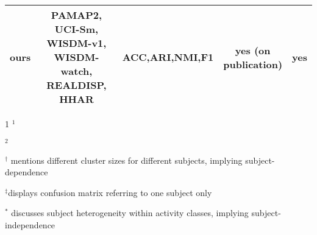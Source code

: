 \documentclass[wcp]{jmlr}
\begin{document}
\begin{table*}[h]
\begin{threeparttable}
{\begin{tabular}{|c|c|c|c|c|}
         \hline
         ours      &  \makecell{PAMAP2, UCI-Sm, \\ WISDM-v1, WISDM-watch, \\ REALDISP, HHAR} &   ACC,ARI,NMI,F1        &   \makecell{yes (on \\ publication)} & yes\\
         \hline
    \end{tabular}}
    \end{threeparttable}
    \begin{tablenotes}
        \footnotesize
        \item[1]{$^1$\cite{altun2010comparative}}
        \item$^2${\cite{malekzadeh2018protecting}}
        \item$^\dag$ mentions different cluster sizes for different subjects, implying subject-dependence
        \item$^\ddag$displays confusion matrix referring to one subject only
        \item$^*$ discusses subject heterogeneity within activity classes, implying subject-independence
    \end{tablenotes}\end{table*}
\end{document}

